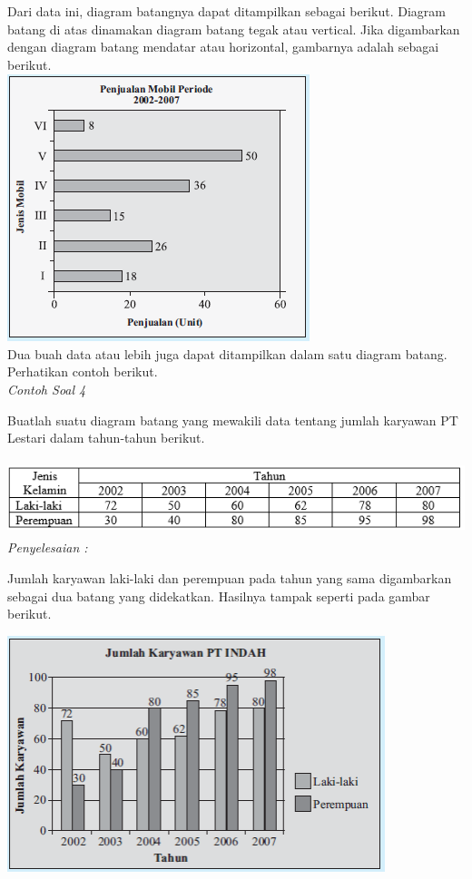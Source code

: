 \documentclass[11pt,fleqn]{book} %
\begin{document}
{Dari data ini, diagram batangnya dapat ditampilkan sebagai berikut.
Diagram batang di atas dinamakan diagram batang tegak atau vertical. Jika digambarkan dengan diagram batang mendatar atau horizontal, gambarnya adalah sebagai berikut.\\

\includegraphics[width = 8.8cm, height= 7.8cm]{Pictures/Gb21_diana.png}\\

Dua buah data atau lebih juga dapat ditampilkan dalam satu diagram batang. Perhatikan contoh berikut.\\

\textit{Contoh Soal 4}

Buatlah suatu diagram batang yang mewakili data tentang jumlah karyawan PT Lestari dalam tahun-tahun berikut.

\includegraphics[width = 15.5cm, height= 2.2cm]{Pictures/Gb22_diana.png}\\

\textit{Penyelesaian :}

Jumlah karyawan laki-laki dan perempuan pada tahun yang sama digambarkan sebagai dua batang yang didekatkan. Hasilnya tampak seperti pada gambar berikut.

\includegraphics[width = 11cm, height= 6.9cm]{Pictures/Gb23_diana.png}\\\\


}
\end{document}
